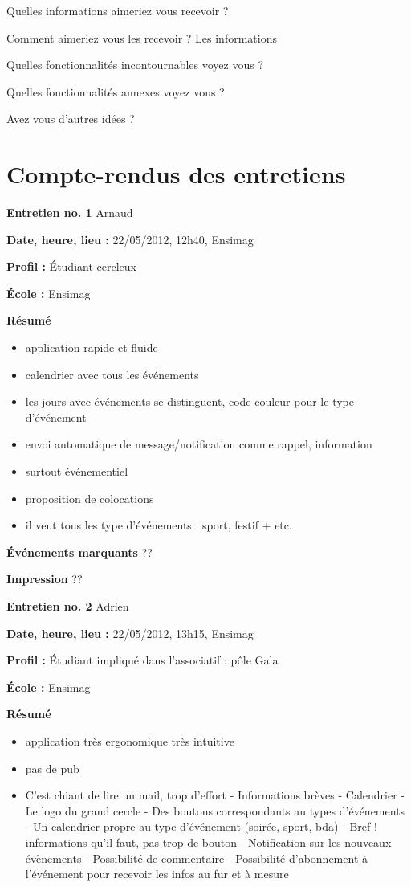 \documentclass[a4paper, 11px]{article}
\begin{document}
Quelles informations aimeriez vous recevoir ?


Comment aimeriez vous les recevoir ?
Les informations


Quelles fonctionnalités incontournables voyez vous ?


Quelles fonctionnalités annexes voyez vous ?


Avez vous d'autres idées ?

\newpage

\section{Compte-rendus des entretiens}

 \textbf {\large Entretien no. 1}
Arnaud

\textbf{Date, heure, lieu : }
22/05/2012, 12h40, Ensimag

\textbf{Profil : }
Étudiant cercleux

\textbf{École : }
Ensimag

\textbf{Résumé}
	\begin{itemize}
		\item application rapide et fluide
		\item calendrier avec tous les événements
		\item les jours avec événements se distinguent, code couleur pour le type d'événement
		\item envoi automatique de message/notification comme rappel, information
		\item surtout événementiel
		\item proposition de colocations
		\item il veut tous les type d'événements : sport, festif + etc.
	\end{itemize}

\textbf{Événements marquants}
??

\textbf{Impression}
??



\vspace{.3cm}

 \textbf {\large Entretien no. 2}
Adrien

\textbf{Date, heure, lieu : }
22/05/2012, 13h15, Ensimag

\textbf{Profil : }
Étudiant impliqué dans l'associatif : pôle Gala

\textbf{École : }
Ensimag

\textbf{Résumé}
	\begin{itemize}
		\item application très ergonomique très intuitive
		\item pas de pub
		\item C’est chiant de lire un mail, trop d'effort
	- Informations brèves
	- Calendrier
	- Le logo du grand cercle
	- Des boutons correspondants au types d’événements
	- Un calendrier propre au type d’événement (soirée, sport, bda)
	- Bref ! informations qu’il faut, pas trop de bouton
	- Notification sur les nouveaux évènements
	- Possibilité de commentaire
	- Possibilité d’abonnement à l’événement pour recevoir les infos au fur et à mesure
	\end{itemize}
\end{document}
